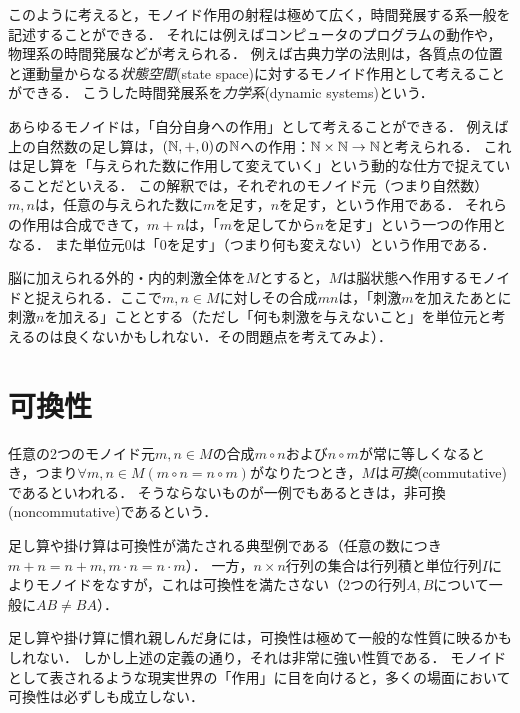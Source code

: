 \documentclass[11pt,a4paper]{jsarticle}
\begin{document}
このように考えると，モノイド作用の射程は極めて広く，時間発展する系一般を記述することができる．
それには例えばコンピュータのプログラムの動作や，物理系の時間発展などが考えられる．
例えば古典力学の法則は，各質点の位置と運動量からなる\emph{状態空間}(state space)に対するモノイド作用として考えることができる．
こうした時間発展系を\emph{力学系}(dynamic systems)という．


\begin{example}
あらゆるモノイドは，「自分自身への作用」として考えることができる．
例えば上の自然数の足し算は，$(\mathbb{N}, +, 0)$の$\mathbb{N}$への作用：$\mathbb{N} \times \mathbb{N} \to \mathbb{N}$と考えられる．
これは足し算を「与えられた数に作用して変えていく」という動的な仕方で捉えていることだといえる．
この解釈では，それぞれのモノイド元（つまり自然数）$m, n$は，任意の与えられた数に$m$を足す，$n$を足す，という作用である．
それらの作用は合成できて，$m+n$は，「$m$を足してから$n$を足す」という一つの作用となる．
また単位元$0$は「$0$を足す」（つまり何も変えない）という作用である．
\end{example}


\begin{example}
    脳に加えられる外的・内的刺激全体を$M$とすると，$M$は脳状態へ作用するモノイドと捉えられる．ここで$m, n \in M$に対しその合成$mn$は，「刺激$m$を加えたあとに刺激$n$を加える」こととする（ただし「何も刺激を与えないこと」を単位元と考えるのは良くないかもしれない．その問題点を考えてみよ）．
\end{example}


\section{可換性}
任意の2つのモノイド元$m,n \in M$の合成$m \circ n$および$n \circ m$が常に等しくなるとき，つまり$\forall m,n \in M (m \circ n = n \circ m)$がなりたつとき，$M$は\emph{可換}(commutative)であるといわれる．
そうならないものが一例でもあるときは，非可換(noncommutative)であるという．

\begin{example}
    足し算や掛け算は可換性が満たされる典型例である（任意の数につき$m+n = n+m, m\cdot n = n\cdot m$）．
    一方，$n \times n$行列の集合は行列積と単位行列$I$によりモノイドをなすが，これは可換性を満たさない（2つの行列$A, B$について一般に$AB \neq BA$）．
\end{example}

足し算や掛け算に慣れ親しんだ身には，可換性は極めて一般的な性質に映るかもしれない．
しかし上述の定義の通り，それは非常に強い性質である．
モノイドとして表されるような現実世界の「作用」に目を向けると，多くの場面において可換性は必ずしも成立しない．
\end{document}
